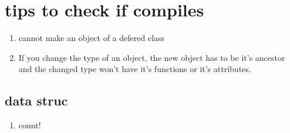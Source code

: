 \documentclass[11pt]{article}
\begin{document}
\section{tips to check if compiles}
\begin{enumerate}
	\item cannot make an object of a defered class
	\item If you change the type of an object, the new object has to be it's ancestor and the changed type won't have it's functions or it's attributes.
\end{enumerate}
\subsection{data struc}
\begin{enumerate}
	\item count!
\end{enumerate}
\end{document}
